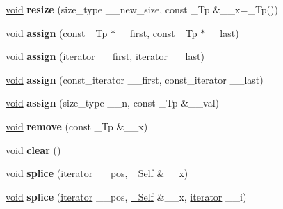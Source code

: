 \begin{DoxyCompactItemize}
\hyperlink{interfacevoid}{void} {\bfseries resize} (size\+\_\+type \+\_\+\+\_\+new\+\_\+size, const \+\_\+\+Tp \&\+\_\+\+\_\+x=\+\_\+\+Tp())
\item 
\mbox{\label{classlist_a2f9cdb6b99ebd4afa09f9fd98b8d7cd8}} 
\hyperlink{interfacevoid}{void} {\bfseries assign} (const \+\_\+\+Tp $\ast$\+\_\+\+\_\+first, const \+\_\+\+Tp $\ast$\+\_\+\+\_\+last)
\item 
\mbox{\label{classlist_a3601bd700b8135e943149f72102d42e8}} 
\hyperlink{interfacevoid}{void} {\bfseries assign} (\hyperlink{structiterator}{iterator} \+\_\+\+\_\+first, \hyperlink{structiterator}{iterator} \+\_\+\+\_\+last)
\item 
\mbox{\label{classlist_a5ef4b36f9c2ba5fe83cd720e93843b33}} 
\hyperlink{interfacevoid}{void} {\bfseries assign} (const\+\_\+iterator \+\_\+\+\_\+first, const\+\_\+iterator \+\_\+\+\_\+last)
\item 
\mbox{\label{classlist_ac7e99d8b527307f57e81b1b6b6cc25d8}} 
\hyperlink{interfacevoid}{void} {\bfseries assign} (size\+\_\+type \+\_\+\+\_\+n, const \+\_\+\+Tp \&\+\_\+\+\_\+val)
\item 
\mbox{\label{classlist_a58be613a63ad4cae1e96b93075dbe85f}} 
\hyperlink{interfacevoid}{void} {\bfseries remove} (const \+\_\+\+Tp \&\+\_\+\+\_\+x)
\item 
\mbox{\label{classlist_ae1074b0be66f99b2b9f657d240e8e589}} 
\hyperlink{interfacevoid}{void} {\bfseries clear} ()
\item 
\mbox{\label{classlist_a2de990150f9cc3b23a52b7d2f9c1712e}} 
\hyperlink{interfacevoid}{void} {\bfseries splice} (\hyperlink{structiterator}{iterator} \+\_\+\+\_\+pos, \hyperlink{classlist}{\+\_\+\+Self} \&\+\_\+\+\_\+x)
\item 
\mbox{\label{classlist_ac096572e90410b2cd1e6b53b6b21eb9a}} 
\hyperlink{interfacevoid}{void} {\bfseries splice} (\hyperlink{structiterator}{iterator} \+\_\+\+\_\+pos, \hyperlink{classlist}{\+\_\+\+Self} \&\+\_\+\+\_\+x, \hyperlink{structiterator}{iterator} \+\_\+\+\_\+i)
\item 
\mbox{\label{classlist_aeb47b5a92f0f20e60a968413fb6a5c3b}} 

\end{DoxyCompactItemize}
